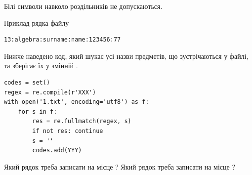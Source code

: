 \documentclass[12pt, ukrainian]{article}
\begin{document}
{Білі символи навколо роздільників не допускаються.

Приклад рядка файлу



\begin{verbatim}
13:algebra:surname:name:123456:77
\end{verbatim}


Нижче наведено код, який шукає усі назви предметів, що зустрічаються у файлі, та зберігає їх у змінній .



\begin{verbatim}
codes = set()
regex = re.compile(r'XXX')
with open('1.txt', encoding='utf8') as f:
    for s in f:
        res = re.fullmatch(regex, s)
        if not res: continue
        s = ''
        codes.add(YYY)
\end{verbatim}



Який рядок треба записати на місце  ?
Який рядок треба записати на місце  ?\par

}
\end{document}
